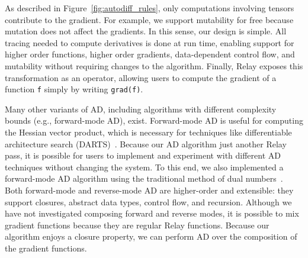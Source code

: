 As described in Figure~\ref{fig:autodiff_rules}, only
  computations involving tensors contribute to the gradient.
For example, we support mutability for free because mutation
  does not affect the gradients.
In this sense, our design is simple.
All tracing needed to compute derivatives is done at run time, enabling
  support for higher order functions, higher order gradients,
  data-dependent control flow, and mutability without requiring changes
  to the algorithm.
Finally, Relay exposes this transformation as an operator, allowing users
  to compute the gradient of a function \verb|f| simply by writing \verb|grad(f)|.

Many other variants of AD, including algorithms with different
  complexity bounds (e.g., forward-mode AD), exist.
Forward-mode AD is useful for computing the
  Hessian vector product, which is necessary for techniques like differentiable architecture search
  (DARTS)~\cite{darts}.
Because our AD algorithm just another Relay pass,
  it is possible for users to implement and experiment with different
  AD techniques without changing the system.
To this end, we also implemented a  forward-mode AD algorithm using the traditional method of dual
  numbers~\cite{ad_survey}.
Both forward-mode and reverse-mode AD are higher-order and extensible: they
  support closures, abstract data types, control flow, and recursion.
Although we have not investigated
  composing forward and reverse modes,
  it is possible to mix gradient functions
  because they are regular Relay functions.
Because our algorithm enjoys a closure property,
  we can perform AD over the composition of the gradient
  functions.

